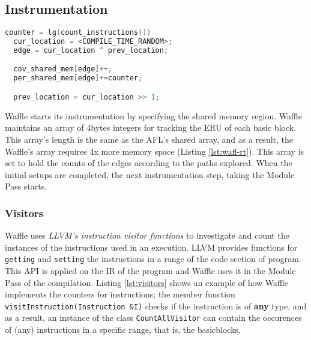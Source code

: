 \subsection{Instrumentation}
\label{subsec:inst}


\begin{lstlisting}[language=C++,style=CodeStyle,label={lst:hash},caption={Select element and update in shared\_mem}]
  counter = lg(count_instructions())
  cur_location = <COMPILE_TIME_RANDOM>;
  edge = cur_location ^ prev_location;

  cov_shared_mem[edge]++;
  per_shared_mem[edge]+=counter;

  prev_location = cur_location >> 1;
\end{lstlisting}

Waffle starts its instrumentation by specifying the shared memory region. Waffle maintains an array of 4bytes integers for tracking the ERU of each basic block. This array's length is the same as the AFL's shared array, and as a result, the Waffle's array requires 4x more memory space (Listing \ref{lst:wafl-rt}). This array is set to hold the counts of the edges according to the paths explored. When the initial setups are completed, the next instrumentation step, taking the Module Pass starts.
  
  


\subsubsection{Visitors}

Waffle uses \textit{LLVM's instruction visitor functions} \cite{inst_visitor} to investigate and count the instances of the instructions used in an execution. LLVM provides functions for \texttt{getting} and \texttt{setting} the instructions in a range of the code section of program. This API is applied on the IR of the program and Waffle uses it in the Module Pass of the compilation. Listing \ref{lst:visitors} shows an example of how Waffle implements the counters for instructions; the member function \texttt{visitInstruction(Instruction \&I)} checks if the instruction is of \textbf{any} type, and as a result, an instance of the class \texttt{CountAllVisitor} can contain the occurences of (any) instructions in a specific range, that is, the basicblocks.

